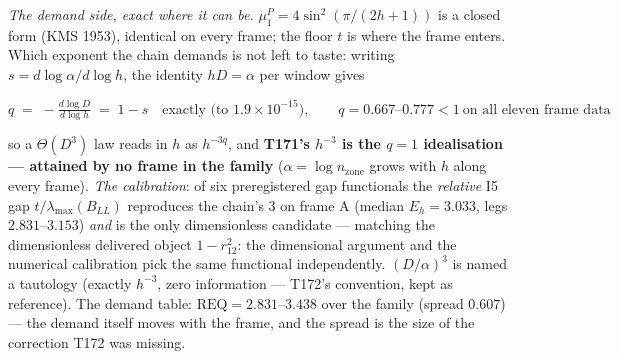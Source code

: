 \documentclass[11pt,a4paper]{article}
\begin{document}
\emph{The demand side, exact where it can be.} $\mu^P_1=4\sin^2(\pi/(2h
+1))$ is a closed form (KMS 1953), identical on every frame; the floor
$t$ is where the frame enters. Which exponent the chain demands is not
left to taste: writing $s=d\log\alpha/d\log h$, the identity
$hD=\alpha$ per window gives
\begin{keyeq}$\displaystyle
q\;=\;-\frac{d\log D}{d\log h}\;=\;1-s\quad\text{exactly (to }1.9\times
10^{-15}\text{)},\qquad q=0.667\text{--}0.777<1\ \text{on all eleven
frame data}$
\end{keyeq}
\noindent so a $\Theta(D^{3})$ law reads in $h$ as $h^{-3q}$, and
\textbf{T171's $h^{-3}$ is the $q=1$ idealisation --- attained by no
frame in the family} ($\alpha=\log n_{\mathrm{zone}}$ grows with $h$
along every frame). \emph{The calibration}: of six preregistered gap
functionals the \emph{relative} I5 gap $t/\lambda_{\max}(B_{LL})$
reproduces the chain's $3$ on frame A (median $E_h=3.033$, legs
$2.831$--$3.153$) \emph{and} is the only dimensionless candidate ---
matching the dimensionless delivered object $1-r_{12}^2$: the
dimensional argument and the numerical calibration pick the same
functional independently. $(D/\alpha)^{3}$ is named a tautology
(exactly $h^{-3}$, zero information --- T172's convention, kept as
reference). The demand table: $\mathrm{REQ}=2.831$--$3.438$ over the
family (spread $0.607$) --- the demand itself moves with the frame, and
the spread is the size of the correction T172 was missing.
\end{document}
